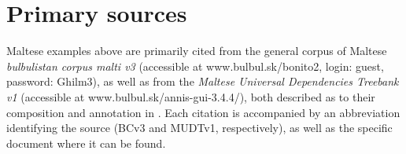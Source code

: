 \documentclass[output=paper]{langsci/langscibook}
\begin{document}

\section*{Primary sources}
Maltese examples above are primarily cited from the general corpus of Maltese \textit{bulbulistan corpus malti v3} (accessible at www.bulbul.sk/bonito2, login: guest, password: Ghilm3), as well as from the \textit{Maltese Universal Dependencies Treebank v1} (accessible at www.bulbul.sk/annis-gui-3.4.4/), both described as to their composition and annotation in \cite{bulbul2018}. Each citation is accompanied by an abbreviation identifying the source (BCv3 and MUDTv1, respectively), as well as the specific document where it can be found.

\sloppy
\printbibliography[heading=subbibliography,notkeyword=this]
\end{document}
